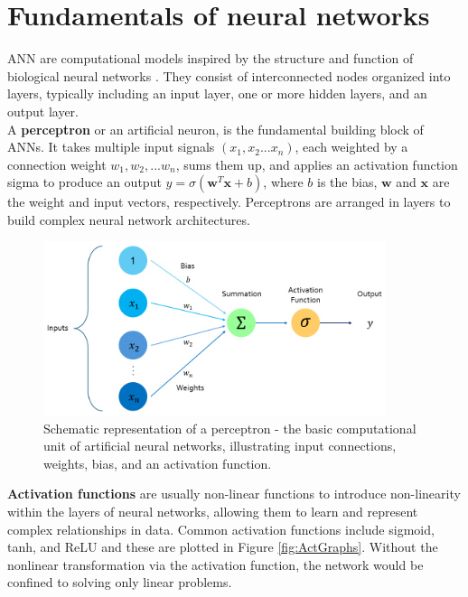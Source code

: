 \section{Fundamentals of neural networks}
\gls{ANN} are computational models inspired by the structure and function of biological neural networks \cite{rumel}. They consist of interconnected nodes organized into layers, typically including an input layer, one or more hidden layers, and an output layer. \\ 
A \textbf{perceptron} or an artificial neuron, is the fundamental building block of ANNs. It takes multiple input signals $\left(x_1, x_2 ...x_n\right)$, each weighted by a connection weight $w_1,w_2,...w_n$, sums them up, and applies an activation function \gls{sigma} to produce an output $y = \sigma \left(\mathbf{w}^T\mathbf{x} + b \right)$, where $b$ is the bias, $\mathbf{w}$ and $\mathbf{x}$ are the weight and input vectors, respectively. Perceptrons are arranged in layers to build complex neural network architectures.\\
\begin{figure}[ht]
    \centering
    \includegraphics[width=10cm]{images/Theory-DL/ActFn.png}
    \caption{Schematic representation of a perceptron - the basic computational unit of artificial neural networks, illustrating input connections, weights, bias, and an activation function.}
    \label{fig:Perceptron}
  \end{figure}
\textbf{Activation functions} are usually non-linear functions to introduce non-linearity within the layers of neural networks, allowing them to learn and represent complex relationships in data. Common activation functions include sigmoid, tanh, and \gls{ReLU} and these are plotted in Figure \ref{fig:ActGraphs}. Without the nonlinear transformation via the activation function, the network would be confined to solving only linear problems. \\
